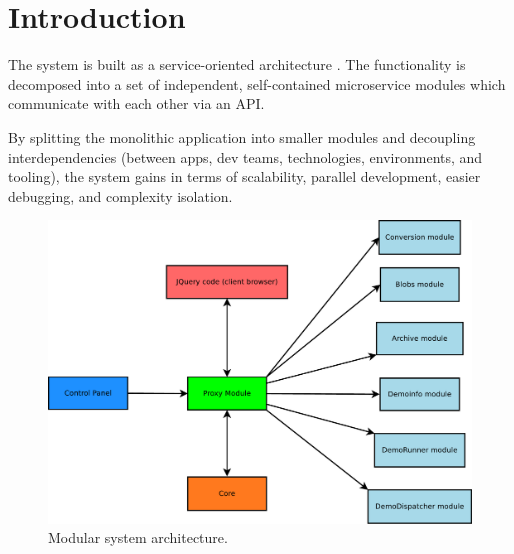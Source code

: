 \section{Introduction}

The system is built as a service-oriented architecture \cite{neuman2015building}.
The functionality is decomposed into a set of independent, self-contained microservice modules which communicate with each other via an API.

By splitting the monolithic application into smaller modules and decoupling interdependencies (between apps, dev teams, technologies, environments, and tooling), the system gains in terms of scalability, parallel development, easier debugging, and complexity isolation.

\begin{figure}[!ht]
\centering
\includegraphics[width=0.8\linewidth]{architecture/images/architecture.pdf}
\caption{Modular system architecture.} 
\label{fig:architecture}
\end{figure}
